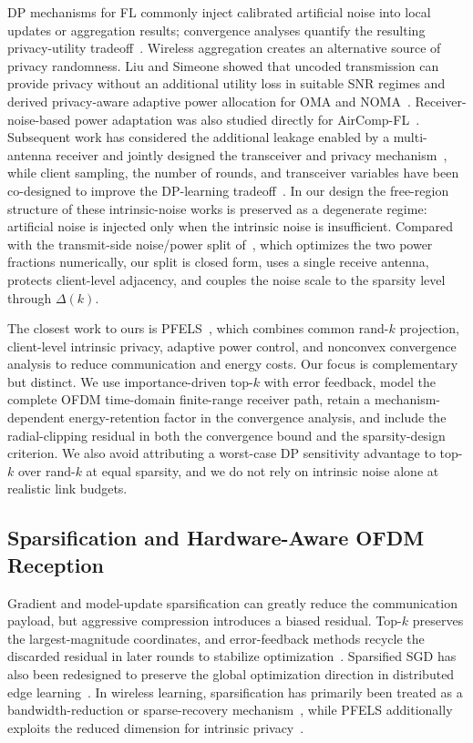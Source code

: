 \documentclass[journal]{IEEEtran}
\begin{document}
DP mechanisms for FL commonly inject calibrated artificial noise into local updates or aggregation results; convergence analyses quantify the resulting privacy-utility tradeoff~\cite{wei2020federated}. Wireless aggregation creates an alternative source of privacy randomness. Liu and Simeone showed that uncoded transmission can provide privacy without an additional utility loss in suitable SNR regimes and derived privacy-aware adaptive power allocation for OMA and NOMA~\cite{liu2020privacy}. Receiver-noise-based power adaptation was also studied directly for AirComp-FL~\cite{koda2020differentially}. Subsequent work has considered the additional leakage enabled by a multi-antenna receiver and jointly designed the transceiver and privacy mechanism~\cite{liu2024mimo}, while client sampling, the number of rounds, and transceiver variables have been co-designed to improve the DP-learning tradeoff~\cite{hu2024communication}. In our design the free-region structure of these intrinsic-noise works is preserved as a degenerate regime: artificial noise is injected only when the intrinsic noise is insufficient. Compared with the transmit-side noise/power split of~\cite{liu2024mimo}, which optimizes the two power fractions numerically, our split is closed form, uses a single receive antenna, protects client-level adjacency, and couples the noise scale to the sparsity level through $\Delta(k)$.

The closest work to ours is PFELS~\cite{zhang2023communication}, which combines common rand-$k$ projection, client-level intrinsic privacy, adaptive power control, and nonconvex convergence analysis to reduce communication and energy costs. Our focus is complementary but distinct. We use importance-driven top-$k$ with error feedback, model the complete OFDM time-domain finite-range receiver path, retain a mechanism-dependent energy-retention factor in the convergence analysis, and include the radial-clipping residual in both the convergence bound and the sparsity-design criterion. We also avoid attributing a worst-case DP sensitivity advantage to top-$k$ over rand-$k$ at equal sparsity, and we do not rely on intrinsic noise alone at realistic link budgets.

\subsection{Sparsification and Hardware-Aware OFDM Reception}

Gradient and model-update sparsification can greatly reduce the communication payload, but aggressive compression introduces a biased residual. Top-$k$ preserves the largest-magnitude coordinates, and error-feedback methods recycle the discarded residual in later rounds to stabilize optimization~\cite{lin2018deep,cao2023overview}. Sparsified SGD has also been redesigned to preserve the global optimization direction in distributed edge learning~\cite{ning2022following}. In wireless learning, sparsification has primarily been treated as a bandwidth-reduction or sparse-recovery mechanism~\cite{amiri2020machine,jeon2021compressive}, while PFELS additionally exploits the reduced dimension for intrinsic privacy~\cite{zhang2023communication}.
\end{document}
